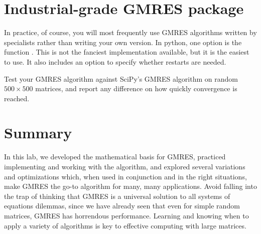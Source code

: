 \section*{Industrial-grade GMRES package}
In practice, of course, you will most frequently use GMRES algorithms written by specialists rather than writing your own version.
In python, one option is the function .
This is not the fanciest implementation available, but it is the easiest to use.
It also includes an option to specify whether restarts are needed.

\begin{problem}
Test your GMRES algorithm against SciPy's GMRES algorithm on random $500\times 500$ matrices, and report any difference on how quickly convergence is reached.
\label{prob:GMRES4}
\end{problem}

\section*{Summary}
In this lab, we developed the mathematical basis for GMRES, practiced implementing and working with the algorithm, and explored several variations and optimizations which, when used in conjunction and in the right situations, make GMRES the go-to algorithm for many, many applications.
Avoid falling into the trap of thinking that GMRES is a universal solution to all systems of equations dilemmas, since we have already seen that even for simple random matrices, GMRES has horrendous performance.
Learning and knowing when to apply a variety of algorithms is key to effective computing with large matrices.
